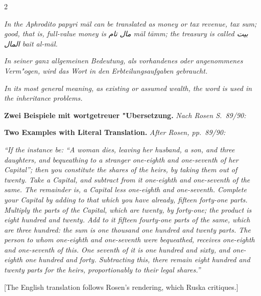 \documentclass[10pt,a4paper]{article}
\newcommand{\RL}[1]{\beginR#1\endR}
\newcommand{\ar}[1]{{\arabicfont\RL{#1}}}
\newcommand{\enquote}[1]{``#1''}
\begin{document}
\begin{paracol}{2}
\switchcolumn

\textit{In the Aphrodito papyri \textit{m\=al} can be translated as money or tax revenue, tax sum; good, that is, full-value money is \ar{مال تام} \textit{m\=al t\=amm}; the treasury is called \ar{بيت المال} \textit{bait al-m\=al}.}

\switchcolumn*

\textit{In seiner ganz allgemeinen Bedeutung, als vorhandenes oder angenommenes Verm"ogen, wird das Wort in den Erbteilungsaufgaben gebraucht.}

\switchcolumn

\textit{In its most general meaning, as existing or assumed wealth, the word is used in the inheritance problems.}

\switchcolumn*

\textbf{Zwei Beispiele mit wortgetreuer "Ubersetzung.} \textit{Nach Rosen S.\ 89/90:}

\switchcolumn

\textbf{Two Examples with Literal Translation.} \textit{After Rosen, pp.\ 89/90:}

\switchcolumn*

\textit{\enquote{If the instance be: \enquote{A woman dies, leaving her husband, a son, and three daughters, and bequeathing to a stranger one-eighth and one-seventh of her Capital}; then you constitute the shares of the heirs, by taking them out of twenty. Take a Capital, and subtract from it one-eighth and one-seventh of the same. The remainder is, a Capital less one-eighth and one-seventh. Complete your Capital by adding to that which you have already, fifteen forty-one parts. Multiply the parts of the Capital, which are twenty, by forty-one; the product is eight hundred and twenty. Add to it fifteen fourty-one parts of the same, which are three hundred: the sum is one thousand one hundred and twenty parts. The person to whom one-eighth and one-seventh were bequeathed, receives one-eighth and one-seventh of this. One seventh of it is one hundred and sixty, and one-eighth one hundred and forty. Subtracting this, there remain eight hundred and twenty parts for the heirs, proportionably to their legal shares.}}

\switchcolumn

[The English translation follows Rosen's rendering, which Ruska critiques.]


\end{paracol}
\end{document}
